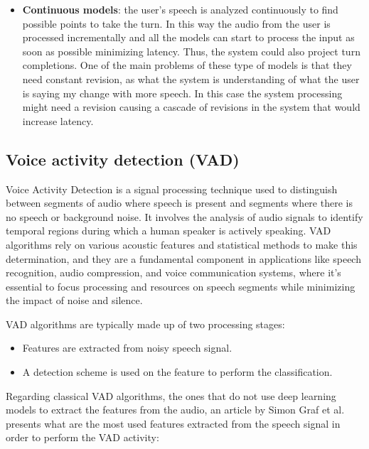 \documentclass[../main.tex]{subfiles}
\begin{document}
\begin{itemize}
\item \textbf{Continuous models}: the user's speech is analyzed continuously to find possible points to take the turn. In this way the audio from the user is processed incrementally and all the models can start to process the input as soon as possible minimizing latency. Thus, the system could also project turn completions. One of the main problems of these type of models is that they need constant revision, as what the system is understanding of what the user is saying my change with more speech. In this case the system processing might need a revision causing a cascade of revisions in the system that would increase latency.
\end{itemize}

\subsection{Voice activity detection (VAD)}
\label{voice activity detection}

Voice Activity Detection is a signal processing technique used to distinguish between segments of audio where speech is present and segments where there is no speech or background noise. It involves the analysis of audio signals to identify temporal regions during which a human speaker is actively speaking. VAD algorithms rely on various acoustic features and statistical methods to make this determination, and they are a fundamental component in applications like speech recognition, audio compression, and voice communication systems, where it's essential to focus processing and resources on speech segments while minimizing the impact of noise and silence.

VAD algorithms are typically made up of two processing stages: 

\begin{itemize}
    \item Features are extracted from noisy speech signal.
    \item A detection scheme is used on the feature to perform the classification.
\end{itemize}

Regarding classical VAD algorithms, the ones that do not use deep learning models to extract the features from the audio, an article by Simon Graf et al. \cite{graf2015features} presents what are the most used features extracted from the speech signal in order to perform the VAD activity:
\end{document}
